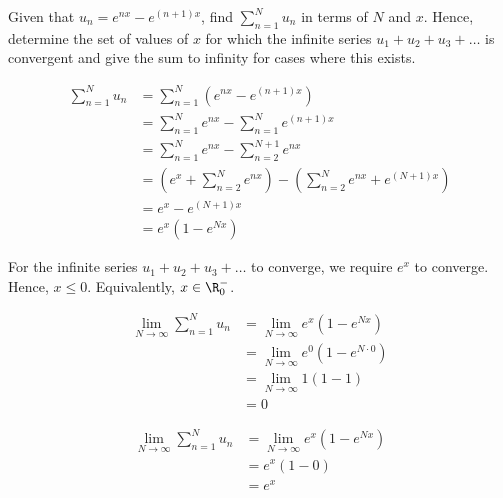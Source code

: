\documentclass{echw}
\begin{document}
    \problem{}
        Given that $u_n = e^{nx} - e^{(n+1)x}$, find $\displaystyle\sum\limits_{n=1}^N u_n$ in terms of $N$ and $x$. Hence, determine the set of values of $x$ for which the infinite series $u_1 + u_2 + u_3 + \ldots$ is convergent and give the sum to infinity for cases where this exists.

    \solution
        \begin{align*}
            \sum\limits_{n=1}^N u_n &= \sum\limits_{n=1}^N \left(e^{nx} - e^{(n+1)x}\right)\\
            &= \sum_{n=1}^N e^{nx} - \sum_{n=1}^N e^{(n+1)x}\\
            &= \sum_{n=1}^N e^{nx} - \sum_{n=2}^{N+1} e^{nx}\\
            &= \left(e^x + \sum_{n=2}^N e^{nx}\right) - \left(\sum_{n=2}^{N} e^{nx} + e^{(N+1)x}\right)\\
            &= e^x - e^{(N+1)x}\\
            &= e^x(1 - e^{Nx})
        \end{align*}


        For the infinite series $u_1 + u_2 + u_3 + \ldots$ to converge, we require $e^x$ to converge. Hence, $x \leq 0$. Equivalently, $x \in \R^-_0$.


        \begin{align*}
            \lim_{N \to \infty} \sum\limits_{n=1}^N u_n &= \lim_{N \to \infty} e^x(1 - e^{Nx}) \\
            &= \lim_{N \to \infty} e^0(1 - e^{N\cdot0}) \\
            &= \lim_{N \to \infty} 1(1 - 1) \\
            &= 0
        \end{align*}


        \begin{align*}
            \lim_{N \to \infty} \sum\limits_{n=1}^N u_n &= \lim_{N \to \infty} e^x(1 - e^{Nx}) \\
            &= e^x(1 - 0)\\
            &= e^x
        \end{align*}

\end{document}
